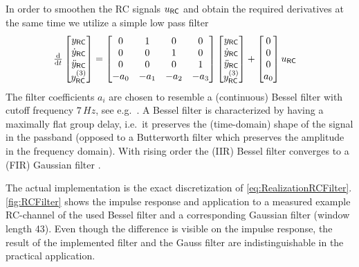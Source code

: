 In order to smoothen the RC signals $\uRC$ and obtain the required derivatives at the same time we utilize a simple low pass filter
\begin{align}\label{eq:RealizationRCFilter}
 \tdiff{t} \begin{bmatrix} \yRC[] \\ \yRCd[] \\ \yRCdd[] \\ \yRCddd[] \end{bmatrix}
 &= \begin{bmatrix} 0 & 1 & 0 & 0 \\ 0 & 0 & 1 & 0 \\ 0 & 0 & 0 & 1 \\ -a_0 & -a_1 & -a_2 & -a_3 \end{bmatrix}
 \begin{bmatrix} \yRC[] \\ \yRCd[] \\ \yRCdd[] \\ \yRCddd[] \end{bmatrix}
 + \begin{bmatrix} 0 \\ 0 \\ 0 \\ a_0 \end{bmatrix}
 \uRC[]
\end{align}
The filter coefficients $a_i$ are chosen to resemble a (continuous) Bessel filter with cutoff frequency $7\,\unit{Hz}$, see e.g.\ \cite[sec.\,13.1.3]{TietzeSchenk:Halbleiter-Schaltungstechnik}.
A Bessel filter is characterized by having a maximally flat group delay, i.e.\ it preserves the (time-domain) shape of the signal in the passband (opposed to a Butterworth filter which preserves the amplitude in the frequency domain).
With rising order the (IIR) Bessel filter converges to a (FIR) Gaussian filter \cite[sec.\ 4.9.2]{Rabiner:DSP}.

The actual implementation is the exact discretization of \eqref{eq:RealizationRCFilter}.
\autoref{fig:RCFilter} shows the impulse response and application to a measured example RC-channel of the used Bessel filter and a corresponding Gaussian filter (window length 43).
Even though the difference is visible on the impulse response, the result of the implemented filter and the Gauss filter are indistinguishable in the practical application.

